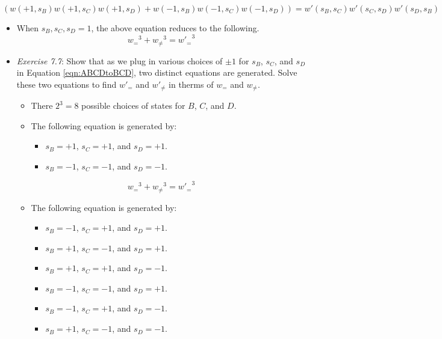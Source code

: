 \documentclass[titlepage]{article}
\numberwithin{figure}{section}
\numberwithin{table}{section}
\numberwithin{equation}{section}
\begin{document}
\begin{equation}\label{eqn:ABCDtoBCD}
    \left( w(+1,s_B)w(+1,s_C)w(+1,s_D) + w(-1,s_B)w(-1,s_C)w(-1,s_D) \right) = w'(s_B,s_C)w'(s_C,s_D)w'(s_D,s_B)
\end{equation}
\begin{itemize}
    \item When $s_B,s_C,s_D=1$, the above equation reduces to the following.
    \begin{equation*}
        {w_=}^3+{w_{\neq}}^3 = {w'_=}^3
    \end{equation*}
    \item \emph{Exercise 7.7}: Show that as we plug in various choices of $\pm 1$ for $s_B$, $s_C$, and $s_D$ in Equation \ref{eqn:ABCDtoBCD}, two distinct equations are generated. Solve these two equations to find $w'_=$ and $w'_{\neq}$ in therms of $w_=$ and $w_{\neq}$.
    \begin{itemize}
        \item There $2^3=8$ possible choices of states for $B$, $C$, and $D$.
        \item The following equation is generated by:
        \begin{itemize}
            \item $s_B=+1$, $s_C=+1$, and $s_D=+1$.
            \item $s_B=-1$, $s_C=-1$, and $s_D=-1$.
        \end{itemize}
    \end{itemize}
    \begin{equation*}
        {w_=}^3+{w_{\neq}}^3 = {w'_=}^3
    \end{equation*}
    \begin{itemize}
        \item The following equation is generated by:
        \begin{itemize}
            \item $s_B=-1$, $s_C=+1$, and $s_D=+1$.
            \item $s_B=+1$, $s_C=-1$, and $s_D=+1$.
            \item $s_B=+1$, $s_C=+1$, and $s_D=-1$.
            \item $s_B=-1$, $s_C=-1$, and $s_D=+1$.
            \item $s_B=-1$, $s_C=+1$, and $s_D=-1$.
            \item $s_B=+1$, $s_C=-1$, and $s_D=-1$.
        \end{itemize}
    \end{itemize}
    \begin{equation*}

\end{equation*}
\end{itemize}
\end{document}
